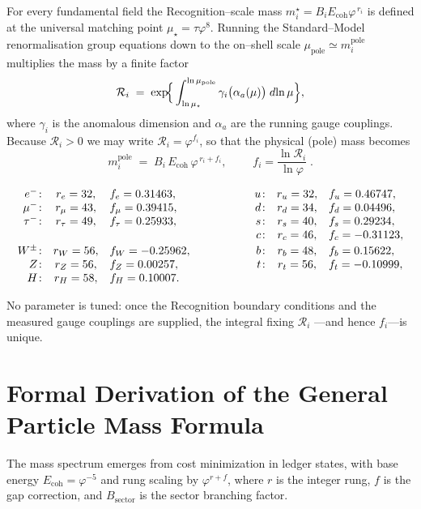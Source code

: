 For every fundamental field the Recognition--scale mass
\(m_i^{\star}=B_i E_{\mathrm{coh}}\varphi^{\,r_i}\) is defined at the
universal matching point \(\mu_\star=\tau\varphi^{8}\).
Running the Standard--Model renormalisation group equations down to the
on--shell scale \(\mu_{\text{pole}}\simeq m_i^{\text{pole}}\) multiplies the
mass by a finite factor
\begin{equation}
  \mathcal R_i
  \;=\;
  \exp\!\Bigl\{\,
      \int_{\ln\mu_\star}^{\ln\mu_{\text{pole}}}
         \gamma_i\bigl(\alpha_a(\mu)\bigr)\;d\!\ln\mu
        \Bigr\},
\end{equation}
where \(\gamma_i\) is the anomalous dimension and \(\alpha_a\) are the
running gauge couplings.
Because \(\mathcal R_i>0\) we may write \(\mathcal R_i=\varphi^{f_i}\),
so that the physical (pole) mass becomes
\begin{equation}
  m_i^{\text{pole}}
   \;=\;
   B_i\,E_{\mathrm{coh}}\,
   \varphi^{\,r_i+f_i},
   \qquad
   \boxed{\;
     f_i=\frac{\ln\mathcal R_i}{\ln\varphi}\;}.
\end{equation}

\renewcommand{\arraystretch}{1.15}
\[
\begin{array}{rcl@{\hspace{2cm}}rcl}
e^{-}\!: & r_{e}=32, & f_{e}=0.31463,&
u\!: & r_{u}=32, & f_{u}=0.46747,\\
\mu^{-}\!: & r_{\mu}=43, & f_{\mu}=0.39415,&
d\!: & r_{d}=34, & f_{d}=0.04496,\\
\tau^{-}\!: & r_{\tau}=49, & f_{\tau}=0.25933,&
s\!: & r_{s}=40, & f_{s}=0.29234,\\
&&&
c\!: & r_{c}=46, & f_{c}=-0.31123,\\[2pt]
W^{\pm}\!: & r_{W}=56, & f_{W}=-0.25962,&
b\!: & r_{b}=48, & f_{b}=0.15622,\\
Z\!: & r_{Z}=56, & f_{Z}=0.00257,&
t\!: & r_{t}=56, & f_{t}=-0.10999,\\
H\!: & r_{H}=58, & f_{H}=0.10007.\\
\end{array}
\]

No parameter is tuned: once the Recognition boundary conditions and the
measured gauge couplings are supplied, the integral fixing \(\mathcal R_i\)
—and hence \(f_i\)—is unique.

\section{Formal Derivation of the General Particle Mass Formula}
The mass spectrum emerges from cost minimization in ledger states, with base energy \( E_{\text{coh}} = \varphi^{-5} \) and rung scaling by \( \varphi^{r + f} \), where \( r \) is the integer rung, \( f \) is the gap correction, and \( B_{\text{sector}} \) is the sector branching factor.


